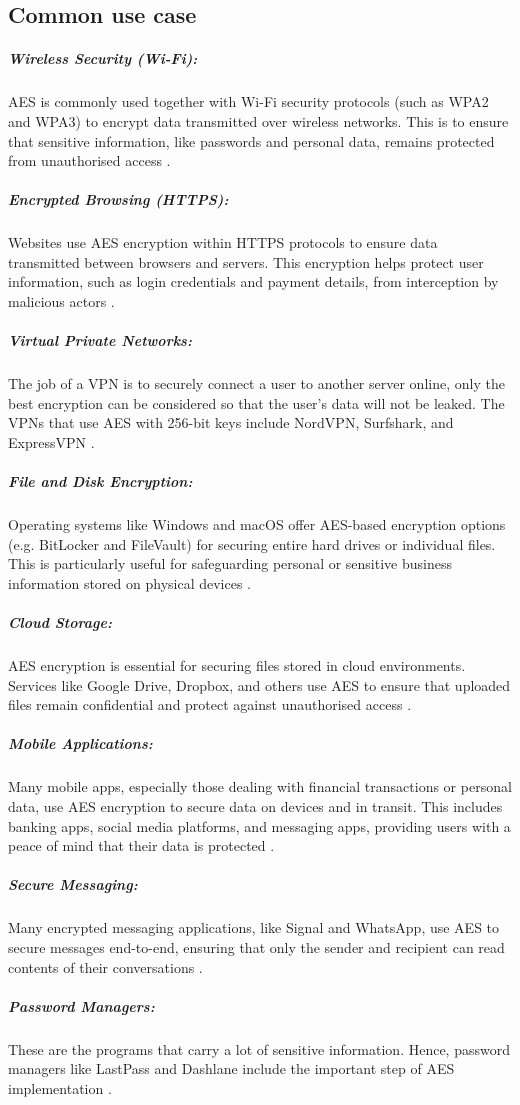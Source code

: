 \subsection{Common use case} 

\subparagraph{Wireless Security (Wi-Fi):} 
AES is commonly used together with Wi-Fi security protocols (such as WPA2 and WPA3) to encrypt data transmitted over wireless networks.
This is to ensure that sensitive information, like passwords and personal data, remains protected from unauthorised access \cite{cooper2025aes}.


\subparagraph{Encrypted Browsing (HTTPS):}
Websites use AES encryption within HTTPS protocols to ensure data transmitted between browsers and servers.
This encryption helps protect user information, such as login credentials and payment details, from interception by malicious actors \cite{cooper2025aes}.


\subparagraph{Virtual Private Networks:}
The job of a \gls{VPN} is to securely connect a user to another server online, only the best encryption can be considered so that the user's data will not be leaked.
The \glspl{VPN} that use AES with 256-bit keys include NordVPN, Surfshark, and ExpressVPN \cite{rimkiene2022aes}.


\subparagraph{File and Disk Encryption:}
Operating systems like Windows and macOS offer AES-based encryption options (e.g. BitLocker and FileVault) for securing entire hard drives or individual files.
This is particularly useful for safeguarding personal or sensitive business information stored on physical devices \cite{cooper2025aes}.


\subparagraph{Cloud Storage:}
AES encryption is essential for securing files stored in cloud environments.
Services like Google Drive, Dropbox, and others use AES to ensure that uploaded files remain confidential and protect against unauthorised access \cite{cooper2025aes}.


\subparagraph{Mobile Applications:}
Many mobile apps, especially those dealing with financial transactions or personal data, use AES encryption to secure data on devices and in transit.
This includes banking apps, social media platforms, and messaging apps, providing users with a peace of mind that their data is protected \cite{cooper2025aes}.


\subparagraph{Secure Messaging:}
Many encrypted messaging applications, like Signal and WhatsApp, use AES to secure messages end-to-end, ensuring that only the sender and recipient can read contents of their conversations \cite{cooper2025aes}.


\subparagraph{Password Managers:}
These are the programs that carry a lot of sensitive information.
Hence, password managers like LastPass and Dashlane include the important step of AES implementation \cite{rimkiene2022aes}.